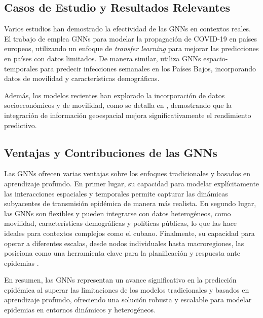 \subsection{Casos de Estudio y Resultados Relevantes}

Varios estudios han demostrado la efectividad de las GNNs en contextos reales. El trabajo de \cite{142} emplea GNNs para modelar la propagación de COVID-19 en países europeos, utilizando un enfoque de \textit{transfer learning} para mejorar las predicciones en países con datos limitados. De manera similar, \cite{144} utiliza GNNs espacio-temporales para predecir infecciones semanales en los Países Bajos, incorporando datos de movilidad y características demográficas.

Además, los modelos recientes han explorado la incorporación de datos socioeconómicos y de movilidad, como se detalla en \cite{143}, demostrando que la integración de información geoespacial mejora significativamente el rendimiento predictivo.

\subsection{Ventajas y Contribuciones de las GNNs}

Las GNNs ofrecen varias ventajas sobre los enfoques tradicionales y basados en aprendizaje profundo. En primer lugar, su capacidad para modelar explícitamente las interacciones espaciales y temporales permite capturar las dinámicas subyacentes de transmisión epidémica de manera más realista. En segundo lugar, las GNNs son flexibles y pueden integrarse con datos heterogéneos, como movilidad, características demográficas y políticas públicas, lo que las hace ideales para contextos complejos como el cubano. Finalmente, su capacidad para operar a diferentes escalas, desde nodos individuales hasta macroregiones, las posiciona como una herramienta clave para la planificación y respuesta ante epidemias \cite{145,146}.

En resumen, las GNNs representan un avance significativo en la predicción epidémica al superar las limitaciones de los modelos tradicionales y basados en aprendizaje profundo, ofreciendo una solución robusta y escalable para modelar epidemias en entornos dinámicos y heterogéneos.
